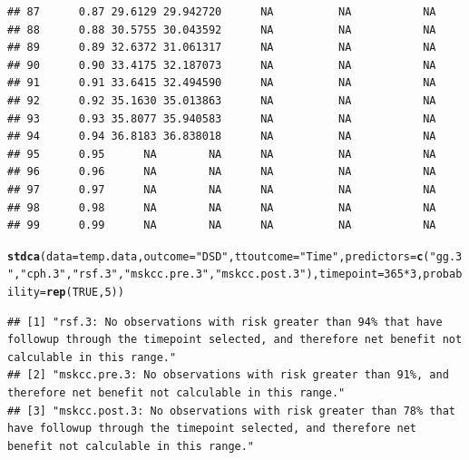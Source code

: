 \documentclass{article}\usepackage[]{graphicx}\usepackage[]{color}
\makeatletter
\newcommand{\hlnum}[1]{\textcolor[rgb]{0.686,0.059,0.569}{#1}}%
\newcommand{\hlstr}[1]{\textcolor[rgb]{0.192,0.494,0.8}{#1}}%
\newcommand{\hlopt}[1]{\textcolor[rgb]{0,0,0}{#1}}%
\newcommand{\hlstd}[1]{\textcolor[rgb]{0.345,0.345,0.345}{#1}}%
\newcommand{\hlkwc}[1]{\textcolor[rgb]{0.333,0.667,0.333}{#1}}%
\newcommand{\hlkwd}[1]{\textcolor[rgb]{0.737,0.353,0.396}{\textbf{#1}}}%
\newenvironment{kframe}{%
 \def\at@end@of@kframe{}%
 \ifinner\ifhmode%
  \def\at@end@of@kframe{\end{minipage}}%
  \begin{minipage}{\columnwidth}%
 \fi\fi%
 \def\FrameCommand##1{\hskip\@totalleftmargin \hskip-\fboxsep
 \colorbox{shadecolor}{##1}\hskip-\fboxsep
     \hskip-\linewidth \hskip-\@totalleftmargin \hskip\columnwidth}%
 \MakeFramed {\advance\hsize-\width
   \@totalleftmargin\z@ \linewidth\hsize
   \@setminipage}}%
 {\par\unskip\endMakeFramed%
 \at@end@of@kframe}
\newenvironment{knitrout}{}{} %
\makeatother
\begin{document}
\begin{knitrout}
\begin{kframe}
\begin{verbatim}
## 87      0.87 29.6129 29.942720      NA          NA           NA
## 88      0.88 30.5755 30.043592      NA          NA           NA
## 89      0.89 32.6372 31.061317      NA          NA           NA
## 90      0.90 33.4175 32.187073      NA          NA           NA
## 91      0.91 33.6415 32.494590      NA          NA           NA
## 92      0.92 35.1630 35.013863      NA          NA           NA
## 93      0.93 35.8077 35.940583      NA          NA           NA
## 94      0.94 36.8183 36.838018      NA          NA           NA
## 95      0.95      NA        NA      NA          NA           NA
## 96      0.96      NA        NA      NA          NA           NA
## 97      0.97      NA        NA      NA          NA           NA
## 98      0.98      NA        NA      NA          NA           NA
## 99      0.99      NA        NA      NA          NA           NA
\end{verbatim}
\begin{alltt}
\hlkwd{stdca}\hlstd{(}\hlkwc{data} \hlstd{= temp.data,} \hlkwc{outcome} \hlstd{=} \hlstr{"DSD"}\hlstd{,} \hlkwc{ttoutcome} \hlstd{=} \hlstr{"Time"}\hlstd{,} \hlkwc{predictors} \hlstd{=} \hlkwd{c}\hlstd{(}\hlstr{"gg.3"}\hlstd{,} \hlstr{"cph.3"}\hlstd{,} \hlstr{"rsf.3"}\hlstd{,} \hlstr{"mskcc.pre.3"}\hlstd{,} \hlstr{"mskcc.post.3"}\hlstd{),} \hlkwc{timepoint} \hlstd{=} \hlnum{365}\hlopt{*}\hlnum{3}\hlstd{,} \hlkwc{probability} \hlstd{=} \hlkwd{rep}\hlstd{(}\hlnum{TRUE}\hlstd{,} \hlnum{5}\hlstd{))}
\end{alltt}
\begin{verbatim}
## [1] "rsf.3: No observations with risk greater than 94% that have followup through the timepoint selected, and therefore net benefit not calculable in this range."       
## [2] "mskcc.pre.3: No observations with risk greater than 91%, and therefore net benefit not calculable in this range."                                                   
## [3] "mskcc.post.3: No observations with risk greater than 78% that have followup through the timepoint selected, and therefore net benefit not calculable in this range."
\end{verbatim}
\end{kframe}


\end{knitrout}
\end{document}
